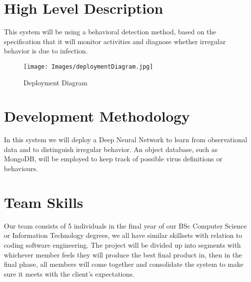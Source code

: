 \documentclass[12pt,a4paper]{article}
\begin{document}


\tableofcontents
\newpage

\section{High Level Description}
This system will be using a behavioral detection method, based on the specification that it will monitor activities and diagnose whether irregular behavior is due to infection.

\begin{figure}
    \texttt{[image: Images/deploymentDiagram.jpg]}
    \caption{Deployment Diagram}
\end{figure}

\section{Development Methodology}
In this system we will deploy a Deep Neural Network to learn from observational data and to distinguish irregular behavior. An object database, such as MongoDB, will be employed to keep track of possible virus definitions or behaviours.

\section{Team Skills}
Our team consists of 5 individuals in the final year of our BSc Computer Science or Information Technology degrees, we all have similar skillsets with relation to coding software engineering. The project will be divided up into segments with whichever member feels they will produce the best final product in, then in the final phase, all members will come together and consolidate the system to make sure it meets with the client's expectations.
\end{document}
